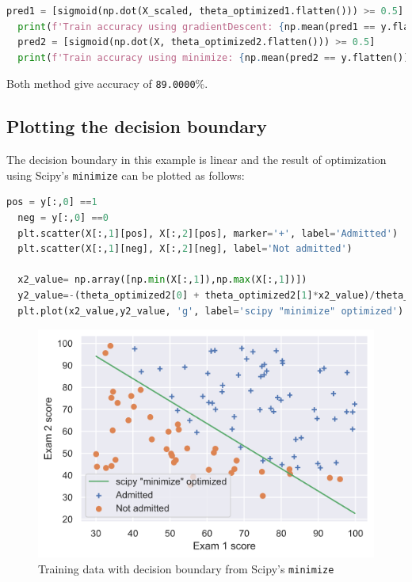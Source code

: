 \documentclass[12pt]{article}
\begin{document}
\begin{lstlisting}[language=Python]
  pred1 = [sigmoid(np.dot(X_scaled, theta_optimized1.flatten())) >= 0.5]
  print(f'Train accuracy using gradientDescent: {np.mean(pred1 == y.flatten()) * 100:.4f}%')
  pred2 = [sigmoid(np.dot(X, theta_optimized2.flatten())) >= 0.5]
  print(f'Train accuracy using minimize: {np.mean(pred2 == y.flatten()) * 100:.4f}%')
\end{lstlisting}

Both method give accuracy of \texttt{89.0000}\%.

\subsection{Plotting the decision boundary}

The decision boundary in this example is linear and the result of optimization using Scipy's \texttt{minimize} can be plotted as follows:

\begin{lstlisting}[language=Python]
  pos = y[:,0] ==1
  neg = y[:,0] ==0
  plt.scatter(X[:,1][pos], X[:,2][pos], marker='+', label='Admitted')
  plt.scatter(X[:,1][neg], X[:,2][neg], label='Not admitted')
    
  x2_value= np.array([np.min(X[:,1]),np.max(X[:,1])])
  y2_value=-(theta_optimized2[0] + theta_optimized2[1]*x2_value)/theta_optimized2[2]
  plt.plot(x2_value,y2_value, 'g', label='scipy "minimize" optimized')
\end{lstlisting}

\begin{figure}[h!]
  \centering
  \includegraphics[scale=0.6]{bestfit1.png}
  \caption{Training data with decision boundary from Scipy's \texttt{minimize}}
  \label{fig:bestfit1}
\end{figure}
\end{document}
